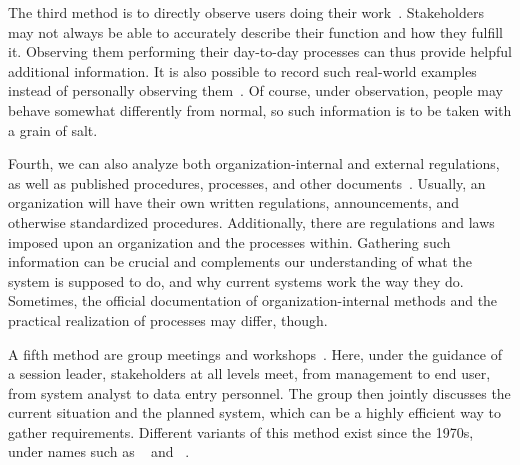 The third method is to directly observe users doing their work~\cite{SGGM2007TMSPATFISRDWS,S2003ISA6P:RDARS}.
Stakeholders may not always be able to accurately describe their function and how they fulfill it.
Observing them performing their day-to-day processes can thus provide helpful additional information.
It is also possible to record such real-world examples instead of personally observing them~\cite{HPW1998REAVWRWS}.
Of course, under observation, people may behave somewhat differently from normal, so such information is to be taken with a grain of salt.

Fourth, we can also analyze both organization-internal and external regulations, as well as published procedures, processes, and other documents~\cite{RGJ2023EASARBFSAR,S2003ISA6P:RDARS}.
Usually, an organization will have their own written regulations, announcements, and otherwise standardized procedures.
Additionally, there are regulations and laws imposed upon an organization and the processes within.
Gathering such information can be crucial and complements our understanding of what the system is supposed to do, and why current systems work the way they do.
Sometimes, the official documentation of organization-internal methods and the practical realization of processes may differ, though.

A fifth method are group meetings and workshops~\cite{S2003ISA6P:RDARS}.
Here, under the guidance of a session leader, stakeholders at all levels meet, from management to end user, from system analyst to data entry personnel.
The group then jointly discusses the current situation and the planned system, which can be a highly efficient way to gather requirements.
Different variants of this method exist since the 1970s, under names such as ~\cite{CWG1993PAJADATC,M1996RTWSS} and ~\cite{CWG1993PAJADATC,FMRSW1989OOSAATSDASD}.

